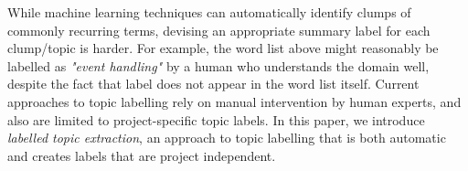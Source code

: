 \documentclass[]{sig-alternate}
\begin{document}
While machine learning techniques can automatically identify clumps of commonly recurring terms, devising an appropriate summary label for each clump/topic is harder.  For example, the word list above might reasonably be labelled as \emph{"event handling"} by a human who understands the domain well, despite the fact that label does not appear in the word list itself.  Current approaches to topic labelling rely on manual intervention by human experts, and also are limited to project-specific topic labels.  In this paper, we introduce \emph{labelled topic extraction}, an approach to topic labelling that is both automatic and creates labels that are project independent.



\end{document}
